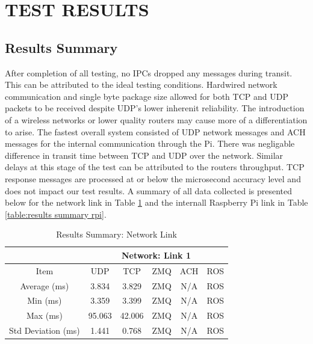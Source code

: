 \section{TEST RESULTS}

\subsection{Results Summary}

After completion of all testing, no IPCs dropped any messages during transit. This can be attributed to the ideal testing conditions. Hardwired network communication and single byte package size allowed for both TCP and UDP packets to be received despite UDP's lower inherenit reliability. The introduction of a wireless networks or lower quality routers may cause more of a differentiation to arise. The fastest overall system consisted of UDP network messages and ACH messages for the internal communication through the Pi. There was negligable difference in transit time between TCP and UDP over the network. Similar delays at this stage of the test can be attributed to the routers throughput. TCP response messages are processed at or below the microsecond accuracy level and does not impact our test results. A summary of all data collected is presented below for the network link in Table \ref{table:results summary net} and the internall Raspberry Pi link in Table \ref{table:results summary rpi}.

\begin{table}[h]
\caption{Results Summary: Network Link}
\label{table:results summary net}
\begin{center}
\begin{tabular}{c|c||c||c||c||c|}
\cline{2-6}
& \multicolumn{5}{c|}{Network: Link 1}\\
\hline
\multicolumn{1}{|c|}{Item} & UDP & TCP & ZMQ &ACH & ROS\\
\hline
\multicolumn{1}{|c|}{Average (ms)} & 3.834 & 3.829 & ZMQ & N/A & ROS\\
\hline
\multicolumn{1}{|c|}{Min (ms)} & 3.359 & 3.399 & ZMQ & N/A & ROS\\
\hline
\multicolumn{1}{|c|}{Max (ms)} & 95.063 & 42.006 & ZMQ & N/A & ROS\\
\hline
\multicolumn{1}{|c|}{Std Deviation (ms)} & 1.441 & 0.768 & ZMQ & N/A & ROS\\
\hline
\end{tabular}
\end{center}
\end{table}

